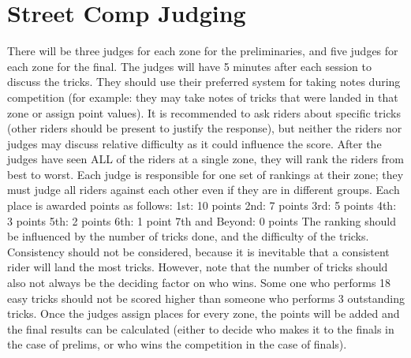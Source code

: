 \section{Street Comp Judging}
There will be three judges for each zone for the preliminaries, and five judges for each zone for the final. The judges will have 5 minutes after each session to discuss the tricks. They should use their preferred system for taking notes during competition (for example: they may take notes of tricks that were landed in that zone or assign point values). It is recommended to ask riders about specific tricks (other riders should be present to justify the response), but neither the riders nor judges may discuss relative difficulty as it could influence the score. After the judges have seen ALL of the riders at a single zone, they will rank the riders from best to worst. Each judge is responsible for one set of rankings at their zone; they must judge all riders against each other even if they are in different groups. Each place is awarded points as follows:
1st: 10 points
2nd: 7 points
3rd: 5 points
4th: 3 points
5th: 2 points
6th: 1 point
7th and Beyond: 0 points
The ranking should be influenced by the number of tricks done, and the difficulty of the tricks. Consistency should not be considered, because it is inevitable that a consistent rider will land the most tricks. However, note that the number of tricks
should also not always be the deciding factor on who wins. Some one who performs 18 easy tricks should not be scored higher than someone who performs 3 outstanding tricks. Once the judges assign places for every zone, the points will be added and the final results can be calculated (either to decide who makes it to the finals in the case of prelims, or who wins the competition in the case of finals).







